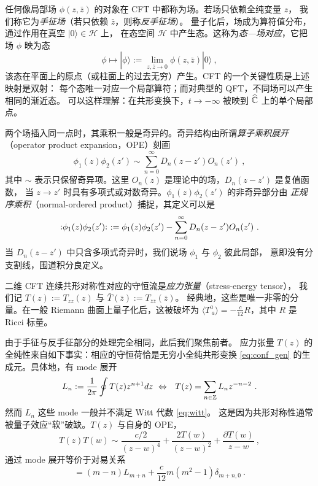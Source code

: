 任何像局部场 $\phi(z,\bar{z})$ 的对象在 CFT 中都称为场。若场只依赖全纯变量 $z$，
我们称它为\emph{手征场}（若只依赖 $\bar{z}$，则称\emph{反手征场}）。
量子化后，场成为算符值分布，通过作用在真空 $|0\rangle\in\mathcal{H}$ 上，
在态空间 $\mathcal{H}$ 中产生态。这称为\emph{态—场对应}，它把场 $\phi$ 映为态
\begin{equation}
\phi\mapsto|\phi\rangle:=\lim_{z,\bar{z}\rightarrow0}\phi(z,\bar{z})|0\rangle~,
\end{equation}
该态在平面上的原点（或柱面上的过去无穷）产生。CFT 的一个关键性质是上述映射是双射：
每个态唯一对应一个局部算符；而对典型的 QFT，不同场可以产生相同的渐近态。
可以这样理解：在共形变换下，$t\rightarrow-\infty$ 被映到 $\widehat{\mathbb{C}}$ 上的单个局部点。

两个场插入同一点时，其乘积一般是奇异的。奇异结构由所谓\emph{算子乘积展开}
（operator product expansion，OPE）刻画
\begin{equation}
\phi_1(z)\phi_2(z')\sim\sum_{n=0}^\infty D_n(z-z') O_n(z')~,
\end{equation}
其中 $\sim$ 表示只保留奇异项。这里 $O_n(z)$ 是理论中的场，$D_n(z-z')$ 是复值函数，
当 $z\to z'$ 时具有多项式或对数奇异。$\phi_1(z)\phi_2(z')$ 的非奇异部分由
\emph{正规序乘积}（normal-ordered product）捕捉，其定义可以是
\begin{equation}
\vcentcolon\mathrel{\phi_1(z)\phi_2(z')}\vcentcolon~:=\phi_1(z)\phi_2(z')-\sum_{n=0}^\infty D_n(z-z') O_n(z')~.
\end{equation}
当 $D_n(z-z')$ 中只含多项式奇异时，我们说场 $\phi_1$ 与 $\phi_2$ 彼此局部，
意即没有分支割线，围道积分良定义。


二维 CFT 连续共形对称性对应的守恒流是\emph{应力张量}（stress-energy tensor），
我们记 $T(z):=T_{zz}(z)$ 与 $\bar{T}(\bar{z}):=T_{\bar{z}\bar{z}}(\bar{z})$。
经典地，这些是唯一非零的分量。在一般 Riemann 曲面上量子化后，这被破坏为
$\langle T^a_{~a}\rangle=-\frac{c}{12}R$，其中 $R$ 是 Ricci 标量。

由于手征与反手征部分的处理完全相同，此后我们聚焦前者。
应力张量 $T(z)$ 的全纯性来自如下事实：相应的守恒荷恰是无穷小全纯共形变换
\eqref{eq:conf_gen} 的生成元。具体地，有 mode 展开
\begin{equation}
L_n:=\frac{1}{2\pi}\oint T(z) z^{n+1} dz~\Leftrightarrow~~T(z)=\sum_{n\in\mathbb{Z}}L_n z^{-n-2}~.
\end{equation}
然而 $L_n$ 这些 mode 一般并不满足 Witt 代数 \eqref{eq:witt}。
这是因为共形对称性通常被量子效应“软”破缺。$T(z)$ 与自身的 OPE，
\begin{equation}
T(z)T(w)\sim\frac{c/2}{(z-w)^4}+\frac{2T(w)}{(z-w)^2}+\frac{\partial T(w)}{z-w}~, 
\end{equation}
通过 mode 展开等价于对易关系
\begin{equation}
[L_m,L_n]=(m-n)L_{m+n}+\frac{c}{12}m(m^2-1)\delta_{m+n,0}~.
\end{equation}

